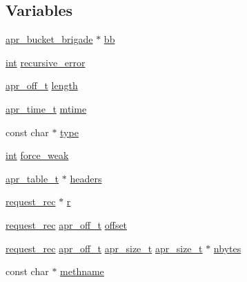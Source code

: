 \subsection*{Variables}
\begin{DoxyCompactItemize}
\item 
\hyperlink{structapr__bucket__brigade}{apr\+\_\+bucket\+\_\+brigade} $\ast$ \hyperlink{group__APACHE__CORE__PROTO_gaa3f67fb4e98cad3cf7b1633f8d7be67a}{bb}
\item 
\hyperlink{pcre_8txt_a42dfa4ff673c82d8efe7144098fbc198}{int} \hyperlink{group__APACHE__CORE__PROTO_gac9eda13e5edf45edc5788be0643a71c5}{recursive\+\_\+error}
\item 
\hyperlink{group__apr__platform_ga6938af9075cec15c88299109381aa984}{apr\+\_\+off\+\_\+t} \hyperlink{group__APACHE__CORE__PROTO_gae8609cee12b4a979fa07fe431b3ee0fb}{length}
\item 
\hyperlink{group__apr__time_gadb4bde16055748190eae190c55aa02bb}{apr\+\_\+time\+\_\+t} \hyperlink{group__APACHE__CORE__PROTO_gaea0b3fefc4391f71693a7858bcdf5e27}{mtime}
\item 
const char $\ast$ \hyperlink{group__APACHE__CORE__PROTO_ga763fd8db6bba8fbbbc113ca0d61c47c2}{type}
\item 
\hyperlink{pcre_8txt_a42dfa4ff673c82d8efe7144098fbc198}{int} \hyperlink{group__APACHE__CORE__PROTO_gaa10508626cb1e5068f2724d3dc581300}{force\+\_\+weak}
\item 
\hyperlink{structapr__table__t}{apr\+\_\+table\+\_\+t} $\ast$ \hyperlink{group__APACHE__CORE__PROTO_gad27a8cead3a9e245c2e63cbf9a15f8c1}{headers}
\item 
\hyperlink{structrequest__rec}{request\+\_\+rec} $\ast$ \hyperlink{group__APACHE__CORE__PROTO_gac89055d45eb7f03e605757210b4adba7}{r}
\item 
\hyperlink{structrequest__rec}{request\+\_\+rec} \hyperlink{group__apr__platform_ga6938af9075cec15c88299109381aa984}{apr\+\_\+off\+\_\+t} \hyperlink{group__APACHE__CORE__PROTO_ga0feae9f93d4bc5dca392194c513e0921}{offset}
\item 
\hyperlink{structrequest__rec}{request\+\_\+rec} \hyperlink{group__apr__platform_ga6938af9075cec15c88299109381aa984}{apr\+\_\+off\+\_\+t} \hyperlink{group__apr__platform_gaaa72b2253f6f3032cefea5712a27540e}{apr\+\_\+size\+\_\+t} \hyperlink{group__apr__platform_gaaa72b2253f6f3032cefea5712a27540e}{apr\+\_\+size\+\_\+t} $\ast$ \hyperlink{group__APACHE__CORE__PROTO_ga19e46b20186d519fe175ae699db0008d}{nbytes}
\item 
const char $\ast$ \hyperlink{group__APACHE__CORE__PROTO_ga881b3e130b3a53164706c3e1e76cfe7b}{methname}

\end{DoxyCompactItemize}
